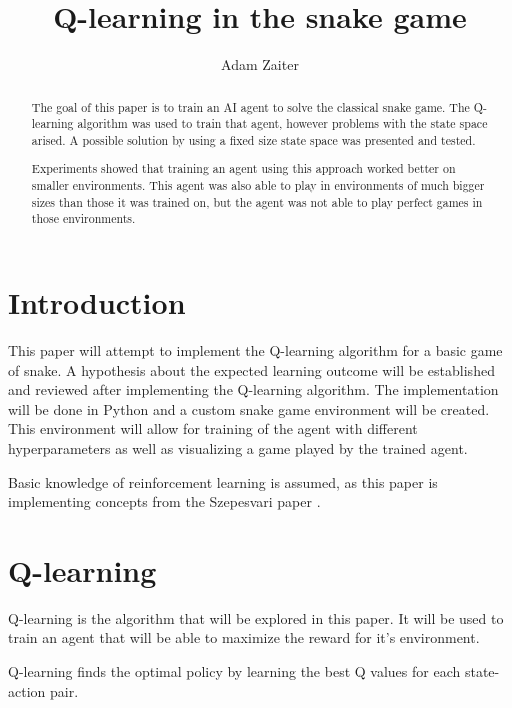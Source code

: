 \documentclass[lettersize,journal]{IEEEtran}
\begin{document}
\title{Q-learning in the snake game}
\author{Adam Zaiter}

\maketitle

\begin{abstract}
The goal of this paper is to train an AI agent to solve the classical snake game.
The Q-learning algorithm was used to train that agent, however
problems with the state space arised. A possible solution by using a fixed size
state space was presented
and tested.

Experiments showed that training an agent using this approach worked better on smaller
environments. This agent was also able to play in environments of much bigger sizes than
those it was trained on, but the agent was not able to play perfect games in those environments.

\end{abstract}



\section{Introduction}
This paper will attempt to implement the Q-learning algorithm
for a basic game of snake. A hypothesis about the expected learning
outcome will be established and reviewed after implementing the
Q-learning algorithm. The implementation will be done in Python
and a custom snake game environment will be created.
This environment will allow for training of the agent with different
hyperparameters as well as visualizing a game played by the
trained agent.


Basic knowledge of reinforcement learning is assumed, as this paper
is implementing concepts from the Szepesvari paper \cite{szepesvari}.

\section{Q-learning}\label{q}
Q-learning is the algorithm that will be explored in this paper.
It will be used to train an agent that will be able to maximize
the reward for it's environment.


Q-learning finds the optimal policy by learning
the best Q values for each state-action pair.
\end{document}
